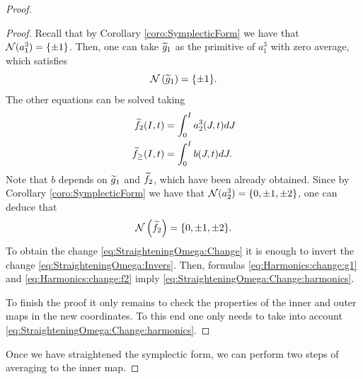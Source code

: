 \begin{proof}
\begin{proof}
Recall that by Corollary \ref{coro:SymplecticForm} we have that $\mathcal{N}(a_1^3)=\{\pm 1\}$. Then, one can take $\widetilde g_1$ as the primitive of $a_1^3$ with zero average, which satisfies
\begin{equation}\label{eq:Harmonics:change:g1}
 \mathcal{N}\left(\widetilde g_1\right)=\{\pm 1\}.
\end{equation}
The other equations can be solved taking
\[
\begin{split}
 \widetilde f_2(I,t)&=\int_0^I a_2^3(J,t)dJ\\
\widetilde f_\geq(I,t)&=\int_0^I b(J,t)dJ.
\end{split}
\]
Note that $b$ depends on $\widetilde g_1$ and $\widetilde f_2$, which have been already obtained.
Since by Corollary \ref{coro:SymplecticForm} we have that $\mathcal{N}(a_2^3)=\{0,\pm 1,\pm 2\}$, one can deduce that
\begin{equation}\label{eq:Harmonics:change:f2}
 \mathcal{N}\left(\widetilde f_2\right)=\{0,\pm 1,\pm 2\}.
\end{equation}
To obtain the change \eqref{eq:StraighteningOmega:Change} it is enough to invert the change \eqref{eq:StraighteningOmega:Invers}. Then,  formulas \eqref{eq:Harmonics:change:g1} and \eqref{eq:Harmonics:change:f2} imply \eqref{eq:StraighteningOmega:Change:harmonics}.


To finish the proof it only remains to check the properties of the inner and outer maps in the new coordinates. To this end one only needs to take into account \eqref{eq:StraighteningOmega:Change:harmonics}.
\end{proof}
Once we have straightened the symplectic form, we can perform two steps of averaging to the inner map.


\end{proof}
